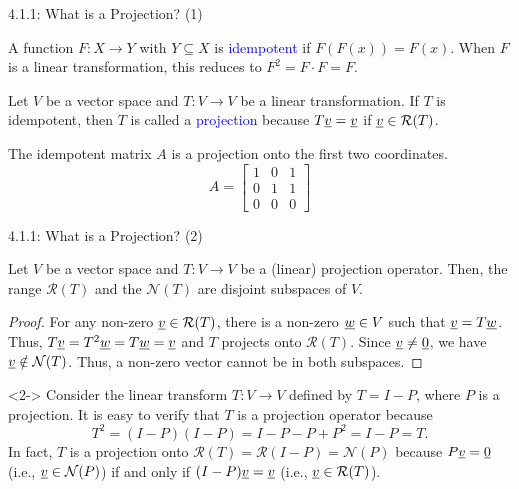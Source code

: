 \documentclass[10pt,english,aspectratio=169]{beamer}
\begin{document}
\begin{frame}{4.1.1: What is a Projection? (1)}

\begin{definition}
A function $F \colon X \rightarrow Y$ with $Y \subseteq X$ is \textcolor{blue}{idempotent} if $F(F(x))=F(x)$.  When $F$ is a linear transformation, this reduces to $F^2 = F \cdot F = F$.
\end{definition}

\begin{definition}
Let $V$ be a vector space and $T \colon V \rightarrow V$ be a linear transformation.
If $T$ is idempotent, then $T$ is called a \textcolor{blue}{projection} because $T\underline{v} = \underline{v}$ if $\underline{v} \in \mathcal{R}(T)$.
\end{definition}

\begin{example}
The idempotent matrix $A$ is a projection onto the first two coordinates. \vspace{-2mm}
\begin{equation*}
A = \begin{bmatrix}
1 & 0 & 1 \\
0 & 1 & 1 \\
0 & 0 & 0
\end{bmatrix}
\end{equation*}
\end{example}

\end{frame}

\begin{frame}{4.1.1:  What is a Projection? (2)}

\begin{theorem}
Let $V$ be a vector space and $T \colon V \rightarrow V$ be a (linear) projection operator.
Then, the range $\mathcal{R}(T)$ and the $\mathcal{N}(T)$ are disjoint subspaces of $V$.
\end{theorem}

\begin{proof}
For any non-zero $\underline{v} \in \mathcal{R}(T)$, there is a non-zero $\underline{w} \in V$ such that $\underline{v} = T\underline{w}$.  Thus, $T\underline{v} = T^2  \underline{w} = T \underline{w} = \underline{v}$ and $T$ projects onto $\mathcal{R}(T)$. Since $\underline{v} \neq \underline{0}$, we have $\underline{v} \notin \mathcal{N}(T)$.
Thus, a non-zero vector cannot be in both subspaces. 
\end{proof}

\begin{example}<2->
Consider the linear transform $T \colon V \rightarrow V$ defined by $T = I - P$, where $P$ is a projection.
It is easy to verify that $T$ is a projection operator because \vspace{-2mm}
\[ T^2 = (I-P)(I-P) = I - P- P + P^2 = I-P = T .\]
In fact, $T$ is a projection onto $\mathcal{R}(T) = \mathcal{R}(I-P) = \mathcal{N}(P)$ because $P \underline{v} = \underline{0}$ (i.e., $\underline{v} \in \mathcal{N}(P)$) if and only if  $(I-P)\underline{v} = \underline{v}$ (i.e., $\underline{v} \in \mathcal{R}(T)$).
\end{example}

\end{frame}
\end{document}
